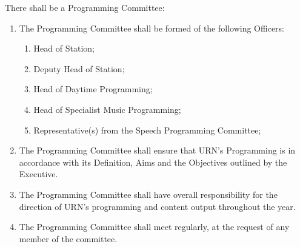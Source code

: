 \item There shall be a Programming Committee:
\begin{enumerate}[label*=\arabic*.]
    \item The Programming Committee shall be formed of the following Officers:
          \begin{enumerate}[label*=\arabic*.]
              \item Head of Station;
              \item Deputy Head of Station;
              \item Head of Daytime Programming;
              \item Head of Specialist Music Programming;
              \item Representative(s) from the Speech Programming Committee;
          \end{enumerate}
    \item The Programming Committee shall ensure that URN's Programming is in accordance with its Definition, Aims and the Objectives outlined by the Executive.
    \item The Programming Committee shall have overall responsibility for the direction of URN's programming and content output throughout the year.
    \item The Programming Committee shall meet regularly, at the request of any member of the committee.
\end{enumerate}
